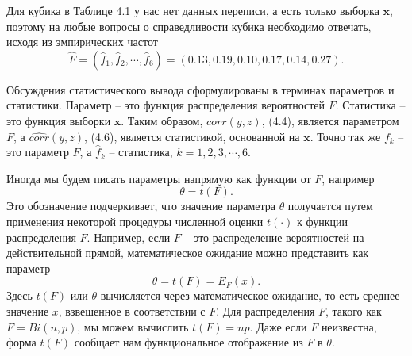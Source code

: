 Для кубика в Таблице 4.1 у нас нет данных переписи, а есть только выборка $\mathbf{x}$, поэтому на любые вопросы о справедливости кубика необходимо отвечать, исходя из эмпирических частот
\begin{equation}
    \hat F=(\hat f_1, \hat f_2,\cdots,\hat f_6)=(0.13,0.19,0.10,0.17,0.14,0.27).
\end{equation}

Обсуждения статистического вывода сформулированы в терминах параметров и статистики. Параметр -- это функция распределения вероятностей $F$. Статистика -- это функция выборки $\mathbf{x}$. Таким образом, $corr (y, z)$, (4.4), является параметром $F$, а $\widehat{corr} (y, z)$, (4.6), является статистикой, основанной на $\mathbf{x}$. Точно так же $f_k$ -- это параметр $F$, а $\hat f_k$ -- статистика, $k = 1, 2, 3, \cdots, 6$.

Иногда мы будем писать параметры напрямую как функции от $F$, например
\begin{equation}
    \theta=t(F).
\end{equation}
Это обозначение подчеркивает, что значение параметра $\theta$ получается путем применения некоторой процедуры численной оценки $t(\cdot)$ к функции распределения $F$. Например, если $F$ -- это распределение вероятностей на действительной прямой, математическое ожидание можно представить как параметр 
\begin{equation}
    \theta=t(F)=E_F(x).
\end{equation}
Здесь $t(F)$ или $\theta$ вычисляется через математическое ожидание, то есть среднее значение $x$, взвешенное в соответствии с $F$. Для распределения $F$, такого как $F = Bi (n, p)$, мы можем вычислить $t (F) = np$. Даже если $F$ неизвестна, форма $t (F)$ сообщает нам функциональное отображение из $F$ в $\theta$. 
